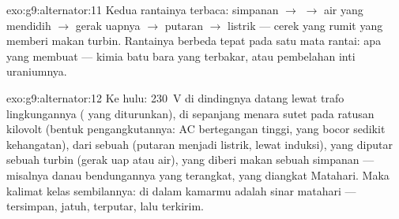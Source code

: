 \begin{solution}{exo:g9:alternator:11}
Kedua rantainya terbaca: simpanan $\to$  $\to$ air yang mendidih
$\to$ gerak uapnya $\to$ putaran $\to$ listrik --- cerek yang rumit
yang memberi makan turbin. Rantainya berbeda tepat pada satu mata
rantai: apa yang membuat  --- kimia batu bara yang terbakar,
atau pembelahan inti uraniumnya.
\end{solution}

\begin{solution}{exo:g9:alternator:12}
Ke hulu: \qty{230}{V} di dindingnya datang lewat trafo lingkungannya
( yang diturunkan), di sepanjang menara sutet pada ratusan
kilovolt (bentuk pengangkutannya: AC bertegangan tinggi, yang bocor
sedikit kehangatan), dari sebuah  (putaran menjadi listrik,
lewat induksi), yang diputar sebuah turbin (gerak uap atau air), yang
diberi makan sebuah simpanan --- misalnya danau bendungannya yang
terangkat, yang diangkat  Matahari. Maka kalimat kelas
sembilannya:  di dalam kamarmu adalah sinar matahari ---
tersimpan, jatuh, terputar, lalu terkirim.
\end{solution}


